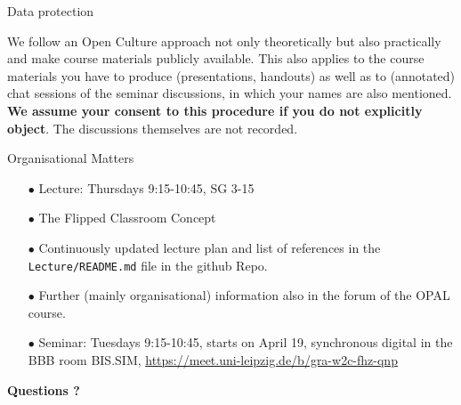 \documentclass{beamer}
\begin{document}
\begin{frame}{Data protection}

We follow an Open Culture approach not only theoretically but also practically
and make course materials publicly available. This also applies to the course
materials you have to produce (presentations, handouts) as well as to
(annotated) chat sessions of the seminar discussions, in which your names are
also mentioned. \textbf{We assume your consent to this procedure if you do not
  explicitly object}. The discussions themselves are not recorded.

\end{frame}

\begin{frame}{Organisational Matters}

\begin{itemize}
\item[$\bullet$] Lecture: Thursdays 9:15-10:45, SG 3-15
\item[$\bullet$] The Flipped Classroom Concept
\item[$\bullet$] Continuously updated lecture plan and list of references in
  the \texttt{Lecture/README.md} file in the github Repo.  
\item[$\bullet$] Further (mainly organisational) information also in the forum
  of the OPAL course.
\item[$\bullet$] Seminar: Tuesdays 9:15-10:45, starts on April 19, synchronous
  digital in the BBB room BIS.SIM,
  \url{https://meet.uni-leipzig.de/b/gra-w2c-fhz-qnp}
\end{itemize}
\begin{center}\LARGE\bf
  Questions ?
\end{center}

\end{frame}
\end{document}
